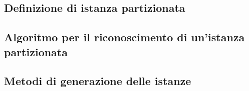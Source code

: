 \documentclass[../../relazione.tex]{subfiles}
\begin{document}
\subsection{Definizione di istanza partizionata}


\subsection{Algoritmo per il riconoscimento di un'istanza partizionata}


\subsection{Metodi di generazione delle istanze}

\end{document}

